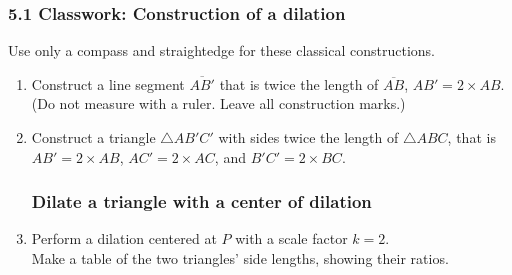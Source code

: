 \documentclass[12pt, twoside]{article}
\begin{document}
\subsubsection*{5.1 Classwork: Construction of a dilation}
Use only a compass and straightedge for these classical constructions.
  \begin{enumerate}

  \item Construct a line segment $\overline{AB'}$ that is twice the length of $\overline{AB}$, $AB' = 2 \times AB$. \\ (Do not measure with a ruler. Leave all construction marks.)
    \vspace{1cm}
    \begin{center}
    \end{center}
    \vspace{3cm}

  \item Construct a triangle $\triangle AB'C'$ with sides twice the length of $\triangle ABC$, that is $AB' = 2 \times AB$, $AC' = 2 \times AC$, and $B'C' = 2 \times BC$.
    \vspace{5cm}
    \begin{flushleft}
  \end{flushleft} 

\newpage
\subsubsection*{Dilate a triangle with a center of dilation}
  \item Perform a dilation centered at $P$ with a scale factor $k=2$. \\
  Make a table of the two triangles' side lengths, showing their ratios.
      \vspace{5cm}
      \begin{center}
      \end{center}


\end{enumerate}
\end{document}
